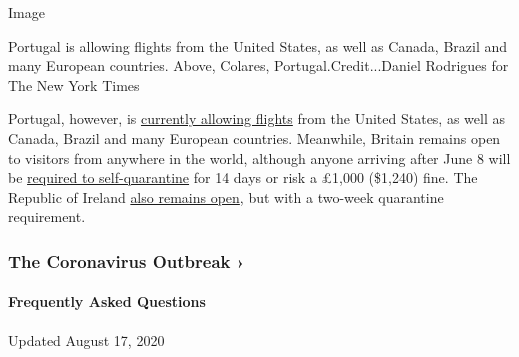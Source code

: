 Image

Portugal is allowing flights from the United States, as well as Canada,
Brazil and many European countries. Above, Colares,
Portugal.Credit...Daniel Rodrigues for The New York Times

Portugal, however, is
\href{https://dre.pt/home/-/dre/133626315/details/maximized}{currently
allowing flights} from the United States, as well as Canada, Brazil and
many European countries. Meanwhile, Britain remains open to visitors
from anywhere in the world, although anyone arriving after June 8 will
be \href{https://www.gov.uk/uk-border-control}{required to
self-quarantine} for 14 days or risk a £1,000 (\$1,240) fine. The
Republic of Ireland
\href{https://www.dfa.ie/travel/travel-advice/coronavirus/}{also remains
open}, but with a two-week quarantine requirement.

\href{https://www.nytimes3xbfgragh.onion/news-event/coronavirus?action=click\&pgtype=Article\&state=default\&region=MAIN_CONTENT_3\&context=storylines_faq}{}

\hypertarget{the-coronavirus-outbreak-}{%
\subsubsection{The Coronavirus Outbreak
›}\label{the-coronavirus-outbreak-}}

\hypertarget{frequently-asked-questions}{%
\paragraph{Frequently Asked
Questions}\label{frequently-asked-questions}}

Updated August 17, 2020

